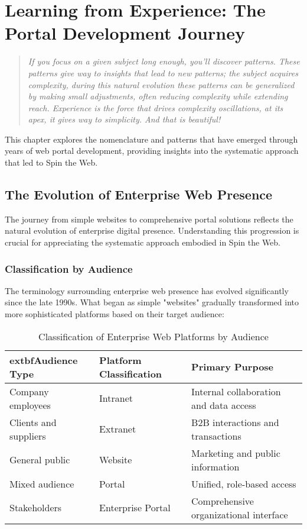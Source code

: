 
\chapter{Learning from Experience: The Portal Development Journey}
\label{chap:learning}

\begin{quote}
\textit{If you focus on a given subject long enough, you'll discover patterns. These patterns give way to insights that lead to new patterns; the subject acquires complexity, during this natural evolution these patterns can be generalized by making small adjustments, often reducing complexity while extending reach. Experience is the force that drives complexity oscillations, at its apex, it gives way to simplicity. And that is beautiful!}
\end{quote}

This chapter explores the nomenclature and patterns that have emerged through years of web portal development, providing insights into the systematic approach that led to Spin the Web.

\section{The Evolution of Enterprise Web Presence}

The journey from simple websites to comprehensive portal solutions reflects the natural evolution of enterprise digital presence. Understanding this progression is crucial for appreciating the systematic approach embodied in Spin the Web.

\subsection{Classification by Audience}

The terminology surrounding enterprise web presence has evolved significantly since the late 1990s. What began as simple "websites" gradually transformed into more sophisticated platforms based on their target audience:

\begin{table}[htbp]
\centering
\caption{Classification of Enterprise Web Platforms by Audience}
\label{tab:audience-classification}
\begin{tabular}{|l|l|l|}
\hline
	extbf{Audience Type} & \textbf{Platform Classification} & \textbf{Primary Purpose} \\
\hline
Company employees & Intranet & Internal collaboration and data access \\
\hline
Clients and suppliers & Extranet & B2B interactions and transactions \\
\hline
General public & Website & Marketing and public information \\
\hline
Mixed audience & Portal & Unified, role-based access \\
\hline
Stakeholders & Enterprise Portal & Comprehensive organizational interface \\
\hline
\end{tabular}
\end{table}

